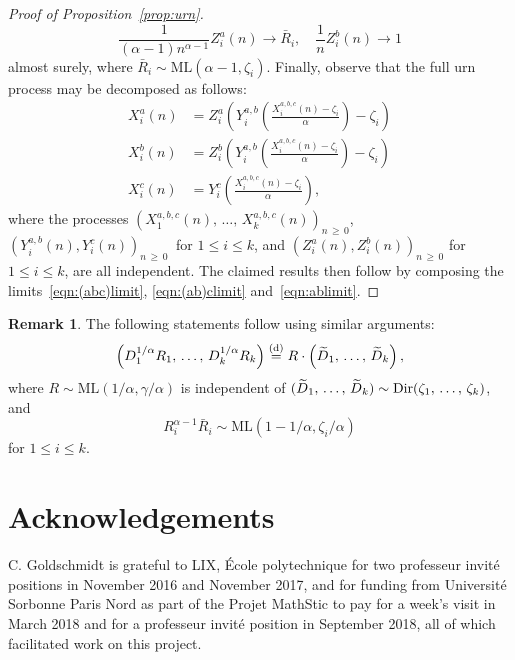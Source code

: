 \documentclass[10pt]{amsart}
\theoremstyle{definition}\newtheorem{defi}[theo]{Definition}\newtheorem{rema}[theo]{Remark}\newtheorem{exam}[theo]{Example}\newtheorem{exem}[theo]{Example}\newtheorem{nota}[theo]{Notation}
\newcommand{\equidist}{\ensuremath{\stackrel{\mathrm{(d)}}{=}}}
\newcommand{\ML}{\mathrm{ML}}
\newcommand{\Dir}{\mathrm{Dir}}
\let\oldtilde\tilde
\renewcommand*{\tilde}[1]{\mathchoice{\widetilde{#1}}{\widetilde{#1}}{\oldtilde{#1}}{\oldtilde{#1}}}
\begin{document}
\begin{proof}[Proof of Proposition~\ref{prop:urn}]
\begin{equation}\label{eqn:ablimit}
\frac{1}{(\alpha-1) n^{\alpha-1}}Z^a_i(n) \to \bar{R}_i, \quad \frac{1}{n} Z^b_i(n) \to 1
\end{equation}
almost surely, where $\bar{R}_i\sim \ML(\alpha-1, \zeta_i)$. Finally, observe that the full urn process may be decomposed as follows:
\begin{align*}
X_i^a(n) & = Z_i^a\left(Y_i^{a,b}\left(\frac{X^{a,b,c}_i(n) -\zeta_i}{\alpha}\right) - \zeta_i\right) \\
X_i^b(n) & = Z_i^b\left(Y_i^{a,b}\left(\frac{X^{a,b,c}_i(n) -\zeta_i}{\alpha}\right) - \zeta_i\right) \\
X_i^c(n) & = Y_i^{c}\left(\frac{X^{a,b,c}_i(n) -\zeta_i}{\alpha}\right),
\end{align*}
where the processes $(X_1^{a,b,c}(n),\,\ldots,\, X_k^{a,b,c}(n))_{n\,\ge\,0}$, $(Y_i^{a,b}(n), Y_i^{c}(n))_{n\,\ge\,0}\ $ for $1 \le i \le k$, and $(Z_i^a(n), Z_i^b(n))_{n\,\ge\,0}$ for $1 \le i \le k$, are all independent. The claimed results then follow by composing the limits~\eqref{eqn:(abc)limit}, \eqref{eqn:(ab)climit} and~\eqref{eqn:ablimit}.
\end{proof}

\begin{rema}\label{rem:identityMLDir}
The following statements follow using similar arguments:
\[
\left(D_1^{1/\alpha} R_1,\,\ldots,\, D_k^{1/\alpha} R_k\right) \equidist R \cdot \left(\tilde{D}_1, \,\ldots,\,\tilde{D}_k\right),
\]
where $R \sim \ML(1/\alpha, \gamma/\alpha)$ is independent of $(\tilde{D}_1,\,\ldots,\,\tilde{D}_k) \sim \Dir(\zeta_1,\,\ldots,\,\zeta_k)$, and
\[
R_i^{\alpha-1} \bar{R}_i \sim \ML\left(1-1/\alpha,\zeta_i/\alpha\right)
\]
for $1 \le i \le k$.
\end{rema}


\section*{Acknowledgements}

C. Goldschmidt is grateful to LIX, {\'E}cole polytechnique for two professeur invité positions in November 2016 and November 2017, and for funding from Université Sorbonne Paris Nord as part of the Projet MathStic to pay for a week's visit in March 2018 and for a professeur invité position in September 2018, all of which facilitated work on this project.
\end{document}
